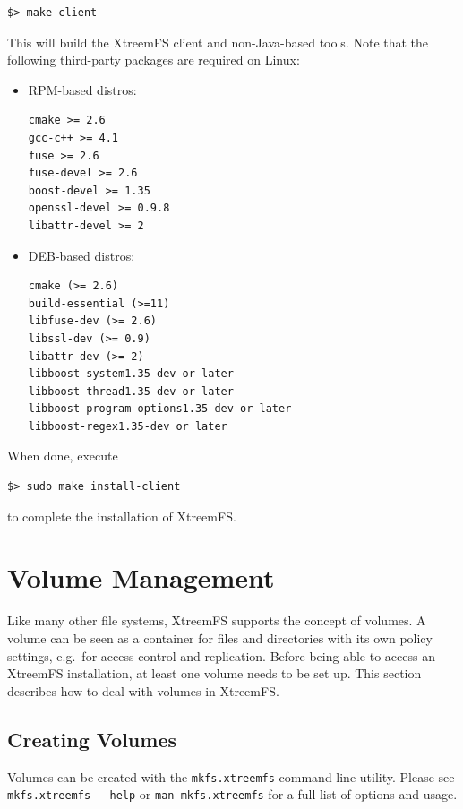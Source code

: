 \documentclass[a4paper,10pt]{book}
\begin{document}
\begin{verbatim}
$> make client
\end{verbatim}

This will build the XtreemFS client and non-Java-based tools. Note that the following third-party packages are required on Linux:

\begin{itemize}
 \item RPM-based distros: \begin{verbatim}
cmake >= 2.6
gcc-c++ >= 4.1
fuse >= 2.6
fuse-devel >= 2.6
boost-devel >= 1.35
openssl-devel >= 0.9.8
libattr-devel >= 2
\end{verbatim}

 \item DEB-based distros: \begin{verbatim}
cmake (>= 2.6)
build-essential (>=11)
libfuse-dev (>= 2.6)
libssl-dev (>= 0.9)
libattr-dev (>= 2)
libboost-system1.35-dev or later
libboost-thread1.35-dev or later
libboost-program-options1.35-dev or later
libboost-regex1.35-dev or later
\end{verbatim}
\end{itemize}

When done, execute

\begin{verbatim}
$> sudo make install-client
\end{verbatim}

to complete the installation of XtreemFS.


\section{Volume Management}

Like many other file systems, XtreemFS supports the concept of volumes. A volume can be seen as a container for files and directories with its own policy settings, e.g.\ for access control and replication. Before being able to access an XtreemFS installation, at least one volume needs to be set up. This section describes how to deal with volumes in XtreemFS.

\subsection{Creating Volumes}
\label{sec:create_volume}

Volumes can be created with the \texttt{mkfs.xtreemfs} command line utility. Please see \texttt{mkfs.xtreemfs ----help} or \texttt{man mkfs.xtreemfs} for a full list of options and usage.
\end{document}
